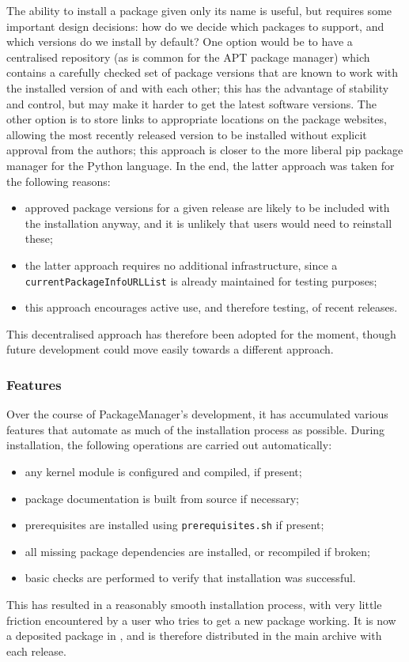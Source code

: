 \documentclass{deliverablereport}
\begin{document}
The ability to install a package given only its name is useful, but requires
some important design decisions: how do we decide which packages to support, and
which versions do we install by default?  One option would be to have a
centralised repository (as is common for the {\sf APT} package manager) which
contains a carefully checked set of package versions that are known to work with
the installed version of \GAP and with each other; this has the advantage of
stability and control, but may make it harder to get the latest software
versions.  The other option is to store links to appropriate locations on the
package websites, allowing the most recently released version to be installed
without explicit approval from the \GAP authors; this approach is closer to the
more liberal {\sf pip} package manager for the Python language.
In the end, the latter approach was taken for the following reasons:
\begin{itemize}
\item approved package versions for a given release are likely to be included
  with the \GAP installation anyway, and it is unlikely that users would need
  to reinstall these;
\item the latter approach requires no additional infrastructure, since a
  \texttt{currentPackageInfoURLList} is already maintained for testing purposes;
\item this approach encourages active use, and therefore testing, of recent releases.
\end{itemize}
This decentralised approach has therefore been adopted for the moment, though
future development could move easily towards a different approach.

\subsubsection{Features}

Over the course of {\sf PackageManager}'s development, it has accumulated
various features that automate as much of the installation process as possible.
During installation, the following operations are carried out automatically:
\begin{itemize}
\item any kernel module is configured and compiled, if present;
\item package documentation is built from source if necessary;
\item prerequisites are installed using \texttt{prerequisites.sh} if present;
\item all missing package dependencies are installed, or recompiled if broken;
\item basic checks are performed to verify that installation was successful.
\end{itemize}
This has resulted in a reasonably smooth installation process, with very little
friction encountered by a user who tries to get a new package working.  It is
now a deposited package in \GAP, and is therefore distributed in the main
archive with each release.
\end{document}
